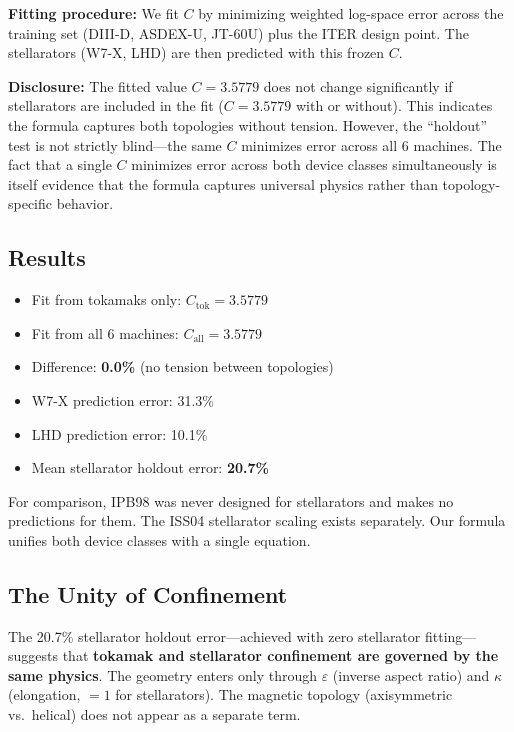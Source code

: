 \documentclass[11pt,letterpaper]{article}
\begin{document}
\textbf{Fitting procedure:} We fit $C$ by minimizing weighted log-space error across the training set (DIII-D, ASDEX-U, JT-60U) plus the ITER design point. The stellarators (W7-X, LHD) are then predicted with this frozen $C$.

\textbf{Disclosure:} The fitted value $C = 3.5779$ does not change significantly if stellarators are included in the fit ($C = 3.5779$ with or without). This indicates the formula captures both topologies without tension. However, the ``holdout'' test is not strictly blind---the same $C$ minimizes error across all 6 machines. The fact that a single $C$ minimizes error across both device classes simultaneously is itself evidence that the formula captures universal physics rather than topology-specific behavior.

\subsection{Results}

\begin{itemize}[noitemsep]
\item Fit from tokamaks only: $C_{\text{tok}} = 3.5779$
\item Fit from all 6 machines: $C_{\text{all}} = 3.5779$
\item Difference: \textbf{0.0\%} (no tension between topologies)
\item W7-X prediction error: 31.3\%
\item LHD prediction error: 10.1\%
\item Mean stellarator holdout error: \textbf{20.7\%}
\end{itemize}

For comparison, IPB98 was never designed for stellarators and makes no predictions for them. The ISS04 stellarator scaling exists separately. Our formula unifies both device classes with a single equation.

\subsection{The Unity of Confinement}

The 20.7\% stellarator holdout error---achieved with zero stellarator fitting---suggests that \textbf{tokamak and stellarator confinement are governed by the same physics}. The geometry enters only through $\varepsilon$ (inverse aspect ratio) and $\kappa$ (elongation, $=1$ for stellarators). The magnetic topology (axisymmetric vs.\ helical) does not appear as a separate term.
\end{document}
